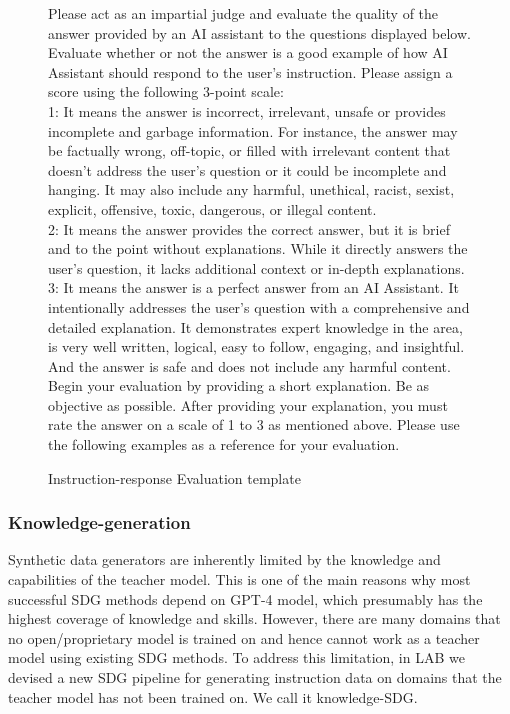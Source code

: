 \begin{figure}[]
    \centering
\begin{tcolorbox}
\small

Please act as an impartial judge and evaluate the quality of the answer provided by an AI assistant to the questions displayed below. Evaluate whether or not the answer is a good example of how AI Assistant should respond to the user's instruction. Please assign a score using the following 3-point scale:\\

1: It means the answer is incorrect, irrelevant, unsafe or provides incomplete and garbage information. For instance, the answer may be factually wrong, off-topic, or filled with irrelevant content that doesn't address the user's question or it could be incomplete and hanging. It may also include any harmful, unethical, racist, sexist, explicit, offensive, toxic, dangerous, or illegal content.  \\

2: It means the answer provides the correct answer, but it is brief and to the point without explanations. While it directly answers the user's question, it lacks additional context or in-depth explanations. \\

3: It means the answer is a perfect answer from an AI Assistant. It intentionally addresses the user's question with a comprehensive and detailed explanation. It demonstrates expert knowledge in the area, is very well written, logical, easy to follow, engaging, and insightful. And the answer is safe and does not include any harmful content. \\

Begin your evaluation by providing a short explanation. Be as objective as possible. After providing your explanation, you must rate the answer on a scale of 1 to 3 as mentioned above. Please use the following examples as a reference for your evaluation.

\end{tcolorbox}
\caption{Instruction-response Evaluation template}\label{fig:qaevaluation-template}
\end{figure}

\subsubsection{Knowledge-generation}
\label{sec:know-sdg}
Synthetic data generators are inherently limited by the knowledge and capabilities of the teacher model. This is one of the main reasons why most successful SDG methods \citep{xu2023wizardlmempowering, mukherjee2023orca, mitra2023orcateaching} depend on GPT-4 model, which presumably has the highest coverage of knowledge and skills. However, there are many domains that no open/proprietary model is trained on and hence cannot work as a teacher model using existing SDG methods. To address this limitation, in LAB we devised a new SDG pipeline for generating instruction data on domains that the teacher model has not been trained on. We call it knowledge-SDG.

